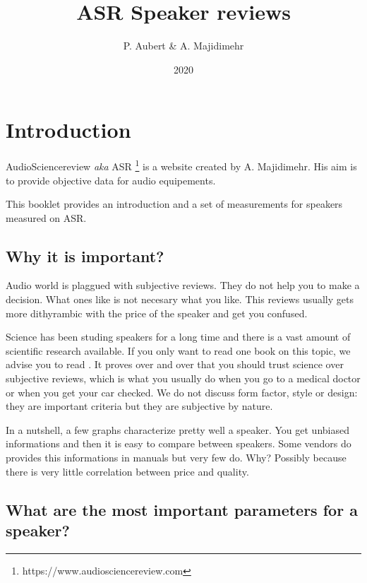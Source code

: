 \documentclass[11pt,oneside,a4paper]{report}
\begin{document}
\title{ASR Speaker reviews}
\author{P. Aubert \& A. Majidimehr}
\date{2020}
\maketitle

\listoffigures

\pagebreak

\chapter{Introduction}

AudioSciencereview \emph{aka} ASR \footnote{https://www.audiosciencereview.com} is a website created by A. Majidimehr.
His aim is to provide objective data for audio equipements.

This booklet provides an introduction and a set of measurements for speakers measured on ASR.

\section{Why it is important?}

Audio world is plaggued with subjective reviews. They do not help you to make a decision. What ones like is
not necesary what you like. This reviews usually gets more dithyrambic with the price of the speaker and
get you confused.

Science has been studing speakers for a long time and there is a vast amount of scientific research available.
If you only want to read one book on this topic, we advise you to read \cite{Toole2013}. It proves over and over
that you should trust science over subjective reviews, which is what you usually do when you go to a medical
doctor or when you get your car checked. We do not discuss form factor, style or design: they are important criteria
but they are subjective by nature.

In a nutshell, a few graphs characterize pretty well a speaker. You get unbiased informations and then it is
easy to compare between speakers. Some vendors do provides this informations in manuals but very few do. Why?
Possibly because there is very little correlation between price and quality.

\section{What are the most important parameters for a speaker?}
\end{document}
